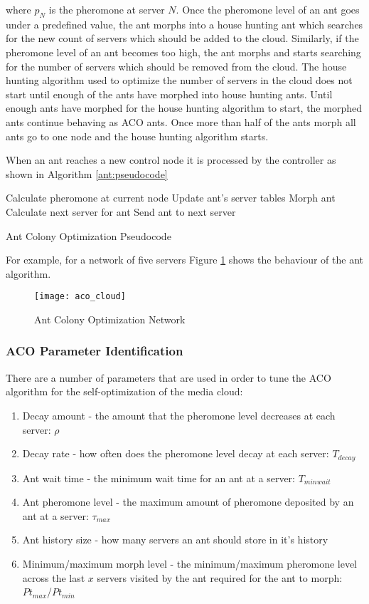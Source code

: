 where $p_{N}$ is the pheromone at server $N$. Once the pheromone level of an ant goes under a predefined value, the ant morphs into a house hunting ant which searches for the new count of servers which should be added to the cloud. Similarly, if the pheromone level of an ant becomes too high, the ant morphs and starts searching for the number of servers which should be removed from the cloud. The house hunting algorithm used to optimize the number of servers in the cloud does not start until enough of the ants have morphed into house hunting ants. Until enough ants have morphed for the house hunting algorithm to start, the morphed ants continue behaving as ACO ants. Once more than half of the ants morph all ants go to one node and the house hunting algorithm starts.

When an ant reaches a new control node it is processed by the controller as shown in Algorithm \ref{ant:pseudocode}

\begin{algorithm}
\begin{algorithmic}
	\State Calculate pheromone at current node
	\State Update ant's server tables
		\State Morph ant
	\Else
		\State Calculate next server for ant
		\State Send ant to next server
	\EndIf
\end{algorithmic}
\caption{Ant Colony Optimization Pseudocode}\label{ant:pseudocode}
\end{algorithm}

For example, for a network of five servers Figure \ref{fig:antnetwork} shows the behaviour of the ant algorithm.

\begin{figure}
	\centering
	\texttt{[image: aco\_cloud]}
	\caption{Ant Colony Optimization Network}
	\label{fig:antnetwork}
\end{figure}

\subsubsection{ACO Parameter Identification}

There are a number of parameters that are used in order to tune the ACO algorithm for the self-optimization of the media cloud:

\begin{enumerate}
	\item Decay amount - the amount that the pheromone level decreases at each server: $\rho$
	\item Decay rate - how often does the pheromone level decay at each server: $T_{decay}$
	\item Ant wait time - the minimum wait time for an ant at a server: $T_{minwait}$
	\item Ant pheromone level - the maximum amount of pheromone deposited by an ant at a server: $\tau_{max}$
	\item Ant history size - how many servers an ant should store in it's history
	\item Minimum/maximum morph level - the minimum/maximum pheromone level across the last $x$ servers visited by the ant required for the ant to morph: $Pt_{max}$/$Pt_{min}$
\end{enumerate}

